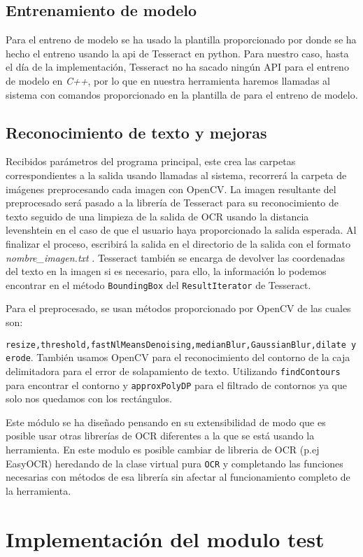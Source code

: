 \subsection{Entrenamiento de modelo}
Para el entreno de modelo se ha usado la plantilla proporcionado por \cite{Joseda} donde se ha hecho el entreno usando la api de Tesseract en python. Para nuestro caso, hasta el día de la implementación, Tesseract no ha sacado ningún API para el entreno de modelo en \emph{C++}, por lo que en nuestra herramienta haremos llamadas al sistema con comandos proporcionado en la plantilla de \cite{Joseda} para el entreno de modelo.
\subsection{Reconocimiento de texto y mejoras}
 Recibidos parámetros del programa principal, este crea las carpetas correspondientes a la salida usando llamadas al sistema, recorrerá la carpeta de imágenes preprocesando cada imagen con OpenCV. La imagen resultante del preprocesado será pasado a la librería de Tesseract para su reconocimiento de texto seguido de una limpieza de la salida de OCR usando la distancia levenshtein en el caso de que el usuario haya proporcionado la salida esperada. Al finalizar el proceso, escribirá la salida en el directorio de la salida con el formato \emph{nombre\_imagen.txt}   .
Tesseract también se encarga de devolver las coordenadas del texto en la imagen si es necesario, para ello, la información lo podemos encontrar en el método \texttt{BoundingBox} del \texttt{ResultIterator} de Tesseract.

Para el preprocesado, se usan métodos proporcionado por OpenCV de las cuales son:

 \texttt{resize,threshold,fastNlMeansDenoising,medianBlur,GaussianBlur,dilate y erode}.
También usamos OpenCV para el reconocimiento del contorno de la caja delimitadora para el error de solapamiento de texto. Utilizando \texttt{findContours} para encontrar el contorno y \texttt{approxPolyDP} para el filtrado de contornos ya que solo nos quedamos con los rectángulos.

Este módulo se ha diseñado pensando en su extensibilidad de modo que es posible usar otras librerías de OCR diferentes a la que se está usando la herramienta.
En este modulo es posible cambiar de libreria de OCR (p.ej EasyOCR) heredando de la clase virtual pura \texttt{OCR} y completando las funciones necesarias con métodos de esa librería sin afectar al funcionamiento completo de la herramienta. 
\section{Implementación del modulo test}
\label{sec:Implementación de los tests}

